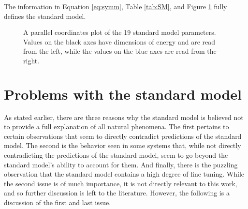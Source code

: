 The information in Equation \ref{eq:symm}, Table \ref{tab:SM}, and Figure \ref{fig:parcorSM} fully defines the standard model.

\begin{figure}
\begin{centering}
\caption{A parallel coordinates plot of the 19 standard model parameters. Values on the black axes have dimensions of energy and are read from the left, while the values on the blue axes are read from the right.}
\label{fig:parcorSM}
\end{centering}
\end{figure}

%
\section{Problems with the standard model}
\label{sec:problems}
As stated earlier, there are three reasons why the standard model is believed not to provide a full explanation of all natural phenomena. The first pertains to certain observations that seem to directly contradict predictions of the standard model. The second is the behavior seen in some systems that, while not directly contradicting the predictions of the standard model, seem to go beyond the standard model's ability to account for them. And finally, there is the puzzling observation that the standard model contains a high degree of fine tuning.  While the second issue is of much importance, it is not directly relevant to this work, and so further discussion is left to the literature. However, the following is a discussion of the first and last issue.

